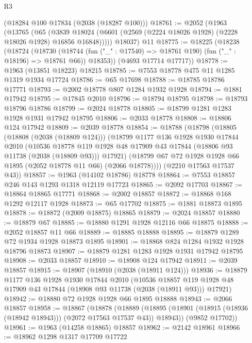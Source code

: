 \begin{lexlean}{R3}
\begin{coremodule}
    (@18284 @100 @17834 (@2038 (@18287 @100)))
@18761 := @2052
    (@1963
      (@13765
        (@65
          (@3839 @18024 (@6601 (@2569 (@2224 @18026 @1928) (@2228 @18026 @1928) @16856 @16848)))))
      @18037)
    @11
@18775 := @18225
    (@18238
      (@18724
        (@18730
          (@18744 (fun ("_" : @17540) => @18761 @190) (fun ("_" : @18196) => @18761 @66))
          @18353))
      (@4693 @17714 @17717))
@18778 := @1963 (@13851 @18223) @18215
@18785 := @7553 @18778 @475 @11 @1285 @1319 @1934 @17724
@18786 := @65 @17698
@18788 := @18785 @18786 @17771
@18793 := @2002 @18778 @807 @1284 @1932 @1928
@18794 := @1881 @17942
@18795 := @17845 @2010
@18796 := @18794 @18795
@18798 := @18793 @18796 @18786
@18799 := @2024 @18778
@18805 := @18799 @1281 @1283 @1928 @1931 @17942 @18795
@18806 := @2033 @18778
@18808 := @18806 @124 @17942
@18809 := @2039 @18778
@18854 := @18788
    (@18798
      (@18805
        (@18808 (@2038 (@18809 @124)))
        (@18799
          @1177
          @136
          @1928
          @1930
          @17844
          @2010
          (@10536
            @18778
            @119
            @1928
            @48
            @17909
            @43
            @17844
            (@18806 @93 @11738 (@2038 (@18809 @93)))
            @17921)
          (@18799 @67 @72 @1928 @1928 @66 @1895 (@2052 @18778 @11 @66) (@2066 @18778))))
      (@2210 @17563 @17537 @43))
@18857 := @1963 (@14102 @18786) @18778
@18864 := @7553 @18857 @246 @143 @1293 @1318 @12119 @17723
@18865 := @2092 @17703
@18867 := @18864 @18865 @17771
@18868 := @2002 @18857
@18872 := @18868 @168 @1292 @12117 @1928
@18873 := @65 @17702
@18875 := @1881 @18873 @1895
@18878 := @18872 (@2009 @18875) @18865
@18879 := @2024 @18857
@18880 := @18879 @67
@18885 := @18880 @1291 @1928 @12116 @66 @18875
@18888 := @2052 @18857 @11 @66
@18889 := @18885 @18888
@18895 := @18879 @1289 @72 @1934 @1928 @18873 @1895
@18901 := @18868 @824 @1284 @1932 @1928 @18796 @18873
@18907 := @18879 @1281 @1283 @1928 @1931 @17942 @18795
@18908 := @2033 @18857
@18910 := @18908 @124 @17942
@18911 := @2039 @18857
@18915 := @18907 (@18910 (@2038 (@18911 @124)))
@18936 := @18879
    @1177
    @136
    @1928
    @1930
    @17844
    @2010
    (@10536 @18857 @119 @1928 @48 @17909 @43 @17844 (@18908 @93 @11738 (@2038 (@18911 @93))) @17921)
@18942 := @18880 @72 @1928 @1928 @66 @1895 @18888
@18943 := @2066 @18857
@18958 := @18867
    (@18878
      (@18889 (@18895 (@18901 (@18915 (@18936 (@18942 @18943))) (@2072 @17563 @17537 @43)) @18943))
      (@9852 @17702))
@18961 := @1963 (@14258 @18865) @18857
@18962 := @2142 @18961
@18966 := @18962 @1298 @1317 @17709 @17722

\end{coremodule}
\end{lexlean}
